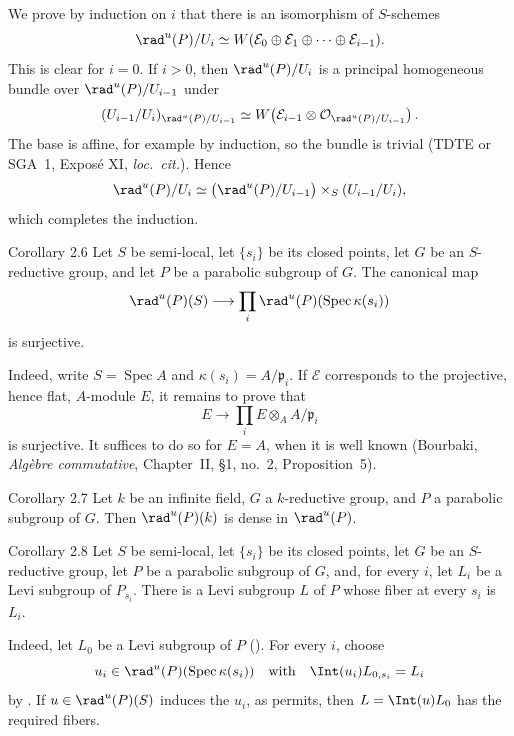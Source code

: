 We prove by induction on \(i\) that there is an isomorphism of \(S\)-schemes
\[
 \rad^u(P)/U_i
 \simeq
 W(\mathcal E_0\oplus\mathcal E_1\oplus\cdots\oplus\mathcal E_{i-1}).
\]
This is clear for \(i=0\).  If \(i>0\), then \(\rad^u(P)/U_i\) is a
principal homogeneous bundle over \(\rad^u(P)/U_{i-1}\) under
\[
 (U_{i-1}/U_i)_{\rad^u(P)/U_{i-1}}
 \simeq
 W\!\left(
 \mathcal E_{i-1}\otimes
 \mathcal O_{\rad^u(P)/U_{i-1}}
 \right).
\]
The base is affine, for example by induction, so the bundle is trivial
(TDTE or SGA~1, Exposé XI, \emph{loc.\ cit.}).  Hence
\[
 \rad^u(P)/U_i
 \simeq
 \bigl(\rad^u(P)/U_{i-1}\bigr)\times_S(U_{i-1}/U_i),
\]
which completes the induction.

\begin{sgastatement}{Corollary 2.6}
Let \(S\) be semi-local, let \(\{s_i\}\) be its closed points, let \(G\)
be an \(S\)-reductive group, and let \(P\) be a parabolic subgroup of
\(G\).  The canonical map
\[
 \rad^u(P)(S)\longrightarrow
 \prod_i\rad^u(P)(\operatorname{Spec}\kappa(s_i))
\]
is surjective.
\end{sgastatement}

Indeed, write \(S=\operatorname{Spec}A\) and
\(\kappa(s_i)=A/\mathfrak p_i\).  If \(\mathcal E\) corresponds to the
projective, hence flat, \(A\)-module \(E\), it remains to prove that
\[
 E\longrightarrow\prod_i E\otimes_A A/\mathfrak p_i
\]
is surjective.  It suffices to do so for \(E=A\), when it is well known
(Bourbaki, \emph{Algèbre commutative}, Chapter~II, §1, no.~2,
Proposition~5).

\begin{sgastatement}{Corollary 2.7}
Let \(k\) be an infinite field, \(G\) a \(k\)-reductive group, and \(P\)
a parabolic subgroup of \(G\).  Then \(\rad^u(P)(k)\) is dense in
\(\rad^u(P)\).
\end{sgastatement}

\begin{sgastatement}{Corollary 2.8}
Let \(S\) be semi-local, let \(\{s_i\}\) be its closed points, let \(G\)
be an \(S\)-reductive group, let \(P\) be a parabolic subgroup of \(G\),
and, for every \(i\), let \(L_i\) be a Levi subgroup of \(P_{s_i}\).
There is a Levi subgroup \(L\) of \(P\) whose fiber at every \(s_i\) is
\(L_i\).
\end{sgastatement}

Indeed, let \(L_0\) be a Levi subgroup of \(P\) ().  For every \(i\),
choose
\[
 u_i\in\rad^u(P)(\operatorname{Spec}\kappa(s_i))
\quad\text{with}\quad
 \Int(u_i)L_{0,s_i}=L_i
\]
by .  If \(u\in\rad^u(P)(S)\) induces the \(u_i\), as  permits,
then \(L=\Int(u)L_0\) has the required fibers.

